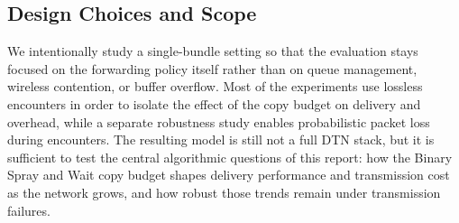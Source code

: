 \subsection{Design Choices and Scope}

We intentionally study a single-bundle setting so that the evaluation stays focused on the forwarding policy itself rather than on queue management, wireless contention, or buffer overflow. Most of the experiments use lossless encounters in order to isolate the effect of the copy budget on delivery and overhead, while a separate robustness study enables probabilistic packet loss during encounters. The resulting model is still not a full DTN stack, but it is sufficient to test the central algorithmic questions of this report: how the Binary Spray and Wait copy budget shapes delivery performance and transmission cost as the network grows, and how robust those trends remain under transmission failures.
